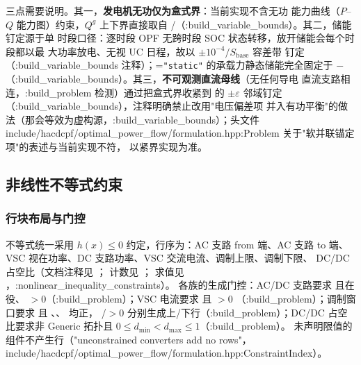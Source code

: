 三点需要说明。其一，\textbf{发电机无功仅为盒式界}：当前实现不含无功
能力曲线（$P$--$Q$ 能力图）约束，$Q^g$ 上下界直接取自
/（:build\_variable\_bounds）。其二，储能钉定源于单
时段口径：逐时段 OPF 无跨时段 SOC 状态转移，放开储能会每个时段都以最
大功率放电、无视 UC 日程，故以 $\pm 10^{-4}/S_{\mathrm{base}}$ 容差带
钉定（:build\_variable\_bounds 注释）；=\texttt{"static"}
的承载力静态储能完全固定于 $-$
（:build\_variable\_bounds）。其三，\textbf{不可观测直流母线}（无任何导电
直流支路相连，:build\_problem 检测）通过把盒式界收紧到  的
$\pm\varepsilon$ 邻域钉定（:build\_variable\_bounds），注释明确禁止改用"电压偏差项
并入有功平衡"的做法（那会等效为虚构源，:build\_variable\_bounds）；头文件
include/hacdcpf/optimal\_power\_flow/formulation.hpp:Problem 关于"软并联锚定项"的表述与当前实现不符，
以紧界实现为准。

\subsection{非线性不等式约束}

\subsubsection*{行块布局与门控}
不等式统一采用 $h(x)\le 0$ 约定，行序为：AC 支路 from 端、AC 支路 to
端、VSC 视在功率、DC 支路功率、VSC 交流电流、调制上限、调制下限、
DC/DC 占空比（文档注释见
；
计数见 ；
求值见 ，:nonlinear\_inequality\_constraints）。
各族的生成门控：AC/DC 支路要求  且在役、
$>0$（:build\_problem）；VSC 电流要求
 且 $>0$
（:build\_problem）；调制窗口要求
 且
、、 均正，
/$>0$ 分别生成上/下行（:build\_problem）；DC/DC 占空
比要求非 Generic 拓扑且 $0\le d_{\min}<d_{\max}\le 1$（:build\_problem）。
未声明限值的组件不产生行（"unconstrained converters add no rows"，
include/hacdcpf/optimal\_power\_flow/formulation.hpp:ConstraintIndex）。

